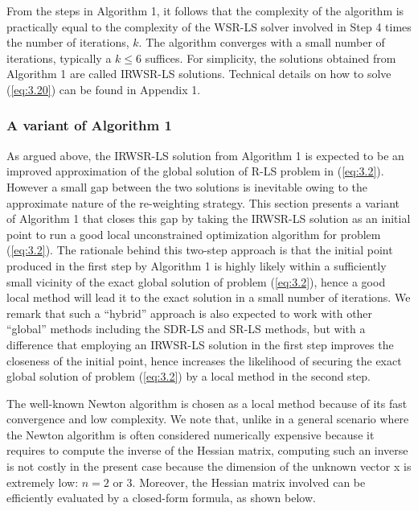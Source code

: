 \phantom{m}

From the steps in Algorithm 1, it follows that the complexity of the algorithm is practically equal to the complexity of the WSR-LS solver involved in Step 4 times the number of iterations, $k$. The algorithm converges with a small number of iterations, typically a $k\leq6$  suffices. For simplicity, the solutions obtained from Algorithm 1 are called IRWSR-LS solutions. Technical details on how to solve (\ref{eq:3.20}) can be found in Appendix 1.

\subsubsection{A variant of Algorithm 1}%

As argued above, the IRWSR-LS solution from Algorithm 1 is expected to be an improved approximation of the global solution of R-LS problem in (\ref{eq:3.2}). However a small gap between the two solutions is inevitable owing to the approximate nature of the re-weighting strategy. This section presents a variant of Algorithm 1 that closes this gap by taking the IRWSR-LS solution as an initial point to run a good local unconstrained optimization algorithm for problem (\ref{eq:3.2}).  The rationale behind this two-step approach is that the initial point produced in the first step by Algorithm 1 is highly likely within a sufficiently small vicinity of the exact global solution of problem (\ref{eq:3.2}), hence a good local method will lead it to the exact solution in a small number of iterations. We remark that such a ``hybrid'' approach is also expected to work with other ``global'' methods including the SDR-LS and SR-LS methods, but with a difference that employing an IRWSR-LS solution in the first step improves the closeness of the initial point, hence increases the likelihood of securing the exact global solution of problem (\ref{eq:3.2}) by a local method in the second step.

The well-known Newton algorithm \cite{AntonLu} is chosen as a local method because of its fast convergence and low complexity. We note that, unlike in a general scenario where the Newton algorithm is often considered numerically expensive because it requires to compute the inverse of the Hessian matrix, computing such an inverse is not costly in the present case because the dimension of the unknown vector x is extremely low: $n = 2$ or 3. Moreover, the Hessian matrix involved can be efficiently evaluated by a closed-form formula, as shown below.

